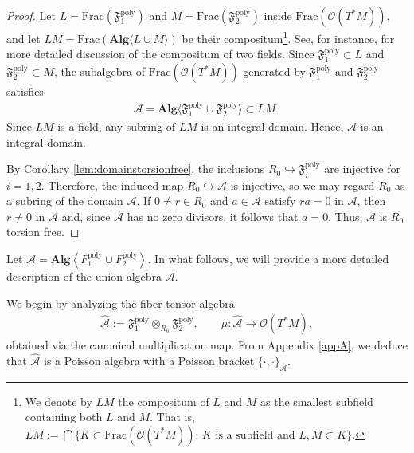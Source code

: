 \documentclass[11pt]{amsart}
\theoremstyle{definition}
\theoremstyle{plain}
\theoremstyle{conclusion}
\begin{document}
\begin{proof}
Let $L=\mathrm{Frac}(\mathfrak{F}_1^{\mathrm{poly}})$ and $M = \mathrm{Frac}(\mathfrak{F}_2^{\mathrm{poly}})$ inside $ \mathrm{Frac}\left(\mathcal{O}(T^*M)\right)$, and let $LM = \mathrm{Frac} \left(\textbf{Alg} \langle L \cup M \rangle \right)$ be their compositum\footnote{We denote by $LM$ the compositum of $L$ and $M$ as the smallest subfield containing both $L$ and $M$. That is, $LM := \bigcap \{K \subset \mathrm{Frac}(\mathcal{O}(T^*M)): \, K \text{ is a subfield and } L,M \subset K\}$.}. See, for instance, \cite[Chapter 5]{LangAlgebra} for more detailed discussion of the compositum of two fields. Since $\mathfrak{F}_1^{\mathrm{poly}}\subset L$ and $\mathfrak{F}_2^{\mathrm{poly}}\subset M$, the subalgebra of $\mathrm{Frac}\left(\mathcal{O}(T^*M)\right)$ generated by $\mathfrak{F}_1^{\mathrm{poly}}$ and $\mathfrak{F}_2^{\mathrm{poly}}$ satisfies \begin{align*}
\mathcal{A}=\textbf{Alg}\langle \mathfrak{F}_1^{\mathrm{poly}}\cup \mathfrak{F}_2^{\mathrm{poly}}\rangle \subset LM\,.
\end{align*} Since $LM$ is a field, any subring of $LM$ is an integral domain. Hence, $\mathcal{A}$ is an integral domain.

By Corollary \ref{lem:domainstorsionfree}, the inclusions $R_0\hookrightarrow \mathfrak{F}_i^{\mathrm{poly}}$ are injective for $i = 1,2$. Therefore, the induced map $R_0\hookrightarrow \mathcal{A}$ is injective, so we may regard $R_0$ as a subring of the domain $\mathcal{A}$. If $0 \neq r \in R_0$ and $a \in \mathcal{A}$ satisfy $ra = 0$ in $\mathcal{A}$, then $r\neq 0$ in $\mathcal{A}$ and, since $\mathcal{A}$ has no zero divisors, it follows that $a = 0$. Thus, $\mathcal{A}$ is $R_0$ torsion free.
\end{proof}


\medskip


Let $\mathcal{A} = \textbf{Alg} \left\langle F_1^{\mathrm{poly}} \cup F_2^{\mathrm{poly}} \right \rangle$. In what follows, we will provide a more detailed description of the union algebra $\mathcal{A}$.   

We begin by analyzing the fiber tensor algebra \begin{align*}
\widehat{\mathcal{A}}:=\mathfrak{F}_1^{\mathrm{poly}}\otimes_{R_0}\mathfrak{F}_2^{\mathrm{poly}}, \qquad  \mu:\widehat{\mathcal{A}}\longrightarrow \mathcal{O}(T^*M),
\end{align*} obtained via the canonical multiplication map. From Appendix \ref{appA}, we deduce that $\widehat{\mathcal{A}}$ is a Poisson algebra with a Poisson bracket $\{\cdot,\cdot\}_{\widehat{\mathcal{A}}}$. 
 
\end{document}
